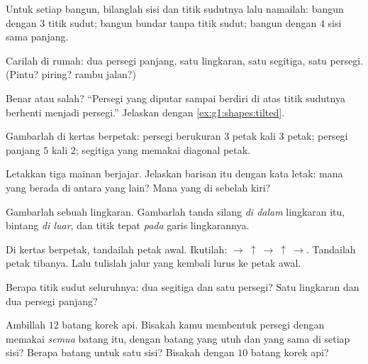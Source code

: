 \begin{exercise}[$\star$]\label{exo:g1:shapes:1}
Untuk setiap bangun, bilanglah sisi dan titik sudutnya lalu namailah:
bangun dengan $3$ titik sudut; bangun bundar tanpa titik sudut;
bangun dengan $4$ sisi sama panjang.
\end{exercise}

\begin{exercise}[$\star$]\label{exo:g1:shapes:2}
Carilah di rumah: dua persegi panjang, satu lingkaran, satu segitiga,
satu persegi. (Pintu? piring? rambu jalan?)
\end{exercise}

\begin{exercise}[$\star$]\label{exo:g1:shapes:3}
Benar atau salah? ``Persegi yang diputar sampai berdiri di atas titik
sudutnya berhenti menjadi persegi.'' Jelaskan dengan
\cref{ex:g1:shapes:tilted}.
\end{exercise}

\begin{exercise}[$\star$]\label{exo:g1:shapes:4}
Gambarlah di kertas berpetak: persegi berukuran $3$ petak kali $3$
petak; persegi panjang $5$ kali $2$; segitiga yang memakai diagonal
petak.
\end{exercise}

\begin{exercise}[$\star$]\label{exo:g1:shapes:5}
Letakkan tiga mainan berjajar. Jelaskan barisan itu dengan kata
letak: mana yang berada di antara yang lain? Mana yang di sebelah
kiri?
\end{exercise}

\begin{exercise}[$\star$]\label{exo:g1:shapes:6}
Gambarlah sebuah lingkaran. Gambarlah tanda silang \emph{di dalam}
lingkaran itu, bintang \emph{di luar}, dan titik tepat \emph{pada}
garis lingkarannya.
\end{exercise}

\begin{exercise}[$\star$]\label{exo:g1:shapes:7}
Di kertas berpetak, tandailah petak awal. Ikutilah:
$\to\ \uparrow\ \to\ \uparrow\ \to$. Tandailah petak tibanya. Lalu
tulislah jalur yang kembali lurus ke petak awal.
\end{exercise}

\begin{exercise}[$\star$]\label{exo:g1:shapes:8}
Berapa titik sudut seluruhnya: dua segitiga dan satu persegi? Satu
lingkaran dan dua persegi panjang?
\end{exercise}

\begin{exercise}[$\star\star$]\label{exo:g1:shapes:9}
Ambillah $12$ batang korek api. Bisakah kamu membentuk persegi dengan
memakai \emph{semua} batang itu, dengan batang yang utuh dan 
yang sama di setiap sisi? Berapa batang untuk satu sisi? Bisakah
dengan $10$ batang korek api?

\end{exercise}
